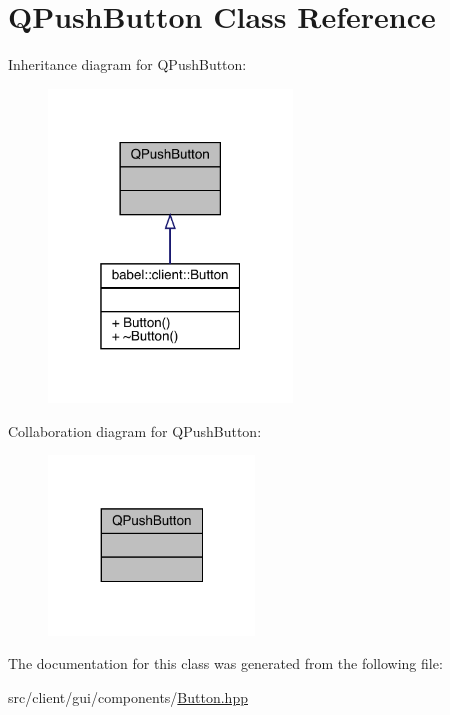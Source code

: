 \hypertarget{class_q_push_button}{}\section{Q\+Push\+Button Class Reference}
\label{class_q_push_button}


Inheritance diagram for Q\+Push\+Button\+:\nopagebreak
\begin{figure}[H]
\begin{center}
\leavevmode
\includegraphics[width=184pt]{class_q_push_button__inherit__graph}
\end{center}
\end{figure}


Collaboration diagram for Q\+Push\+Button\+:\nopagebreak
\begin{figure}[H]
\begin{center}
\leavevmode
\includegraphics[width=155pt]{class_q_push_button__coll__graph}
\end{center}
\end{figure}


The documentation for this class was generated from the following file\+:\begin{DoxyCompactItemize}
\item 
src/client/gui/components/\mbox{\hyperlink{_button_8hpp}{Button.\+hpp}}\end{DoxyCompactItemize}
